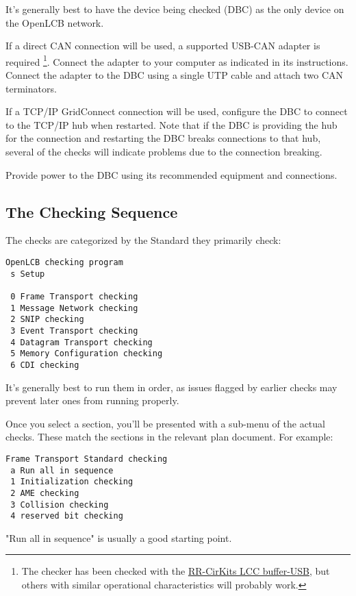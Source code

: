 \documentclass[11pt]{article}
\begin{document}
It's generally best to have the device being checked (DBC) 
as the only device on the OpenLCB network. 

If a direct CAN connection will be used,
a supported USB-CAN adapter is required
\footnote{The checker has been checked with the
\href{https://www.rr-cirkits.com/description/LCC-usb-flyer.pdf}{RR-CirKits LCC buffer-USB},
but others with similar operational characteristics will probably work.
}. 
Connect the adapter to your computer as indicated in its instructions.
Connect the adapter to the DBC using a single UTP cable
and attach two CAN terminators.

If a TCP/IP GridConnect connection will be used, 
configure the DBC to connect to the TCP/IP hub when restarted. Note that if 
the DBC is providing the hub for the connection and restarting the DBC
breaks connections to that hub, several of the checks will indicate problems
due to the connection breaking.

Provide power to the DBC using its recommended equipment and connections.

\subsection{The Checking Sequence}

The checks are categorized by the Standard they primarily check:

\begin{verbatim}
OpenLCB checking program
 s Setup

 0 Frame Transport checking
 1 Message Network checking
 2 SNIP checking
 3 Event Transport checking
 4 Datagram Transport checking
 5 Memory Configuration checking
 6 CDI checking

\end{verbatim}

It's generally best to run them in order, as issues flagged by earlier
checks may prevent later ones from running properly.

Once you select a section, you'll be presented with a sub-menu of the
actual checks.  These match the sections in the relevant plan document.
For example:

\begin{verbatim}
Frame Transport Standard checking
 a Run all in sequence
 1 Initialization checking
 2 AME checking
 3 Collision checking
 4 reserved bit checking
\end{verbatim}

"Run all in sequence" is usually a good starting point.
\end{document}
